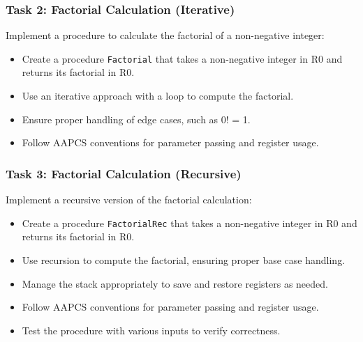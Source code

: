 \subsubsection{Task 2: Factorial Calculation (Iterative)}
Implement a procedure to calculate the factorial of a non-negative integer:
\begin{itemize}[nosep]
    \item Create a procedure \texttt{Factorial} that takes a non-negative integer in R0 and returns its factorial in R0.
    \item Use an iterative approach with a loop to compute the factorial.
    \item Ensure proper handling of edge cases, such as 0! = 1.
    \item Follow AAPCS conventions for parameter passing and register usage.
\end{itemize}
\subsubsection{Task 3: Factorial Calculation (Recursive)}
Implement a recursive version of the factorial calculation:
\begin{itemize}[nosep]
    \item Create a procedure \texttt{FactorialRec} that takes a non-negative integer in R0 and returns its factorial in R0.
    \item Use recursion to compute the factorial, ensuring proper base case handling.
    \item Manage the stack appropriately to save and restore registers as needed.
    \item Follow AAPCS conventions for parameter passing and register usage.
    \item Test the procedure with various inputs to verify correctness.
\end{itemize}